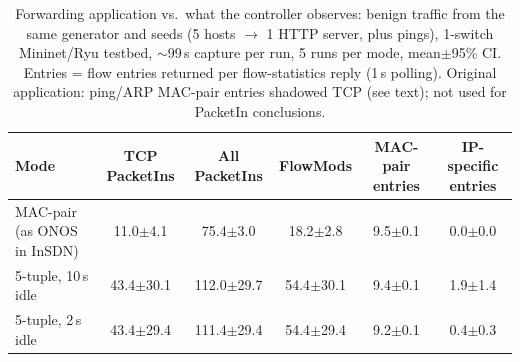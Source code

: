 \begin{table}[t]
\caption{Forwarding application vs.\ what the controller observes: benign traffic from the same generator and seeds (5 hosts $\rightarrow$ 1 HTTP server, plus pings), 1-switch Mininet/Ryu testbed, $\sim$99\,s capture per run, 5 runs per mode, mean{\scriptsize$\pm$}95\% CI. Entries = flow entries returned per flow-statistics reply (1\,s polling). Original application: ping/ARP MAC-pair entries shadowed TCP (see text); not used for PacketIn conclusions.}
\label{tab:livev1}
\centering\small
\begin{tabular}{lccccc}
\toprule
Mode & TCP PacketIns & All PacketIns & FlowMods & MAC-pair entries & IP-specific entries \\
\midrule
MAC-pair (as ONOS in InSDN) & 11.0{\scriptsize$\pm$4.1} & 75.4{\scriptsize$\pm$3.0} & 18.2{\scriptsize$\pm$2.8} & 9.5{\scriptsize$\pm$0.1} & 0.0{\scriptsize$\pm$0.0} \\
5-tuple, 10\,s idle & 43.4{\scriptsize$\pm$30.1} & 112.0{\scriptsize$\pm$29.7} & 54.4{\scriptsize$\pm$30.1} & 9.4{\scriptsize$\pm$0.1} & 1.9{\scriptsize$\pm$1.4} \\
5-tuple, 2\,s idle & 43.4{\scriptsize$\pm$29.4} & 111.4{\scriptsize$\pm$29.4} & 54.4{\scriptsize$\pm$29.4} & 9.2{\scriptsize$\pm$0.1} & 0.4{\scriptsize$\pm$0.3} \\
\bottomrule
\end{tabular}
\end{table}
